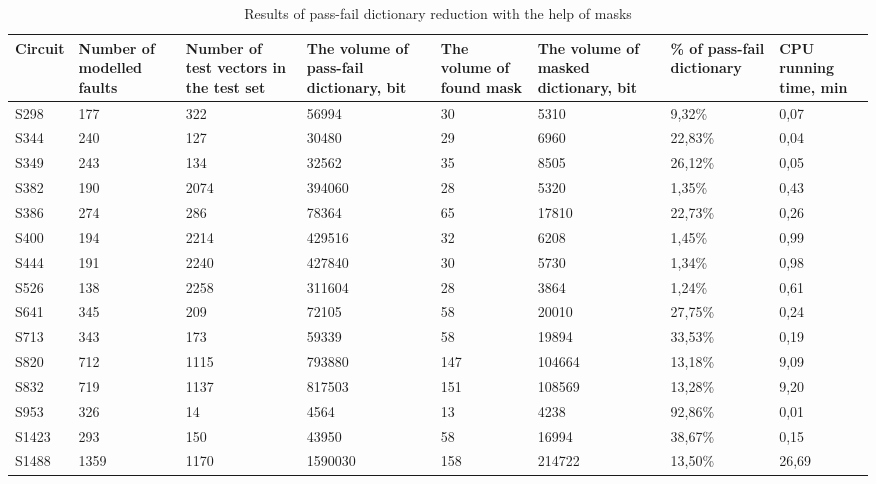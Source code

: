 \documentclass[nir, och, master]{SCWorks}
\begin{document}
\begin{table}[!ht]
	\footnotesize
	\caption{Results of pass-fail dictionary reduction with the help
	of masks} \label{table-2}
	\begin{tabular}{|p{1.5cm}|
	                 p{1.5cm}|
	                 p{1.5cm}|
	                 p{1.5cm}|
	                 p{1cm}|
	                 p{1.5cm}|
	                 p{1.5cm}|
	                 p{1cm}|}
		\hline \centering Circuit & Number of modelled faults & Number of test
		vectors in the test set & The volume of pass-fail dictionary,
		\linebreak bit & The volume of found mask & The volume of
		masked dictionary, \linebreak bit & \raggedright \% of pass-fail dictionary
		& CPU running time, \linebreak min
		\\
		\hline S298 & 177 & 322 & 56994 & 30 & 5310 & 9,32\% & 0,07\\
		\hline S344 & 240 & 127 & 30480 & 29 & 6960 & 22,83\% & 0,04\\
		\hline S349 & 243 & 134 & 32562 & 35 & 8505 & 26,12\% & 0,05\\
		\hline S382 & 190 & 2074 & 394060 & 28 & 5320 & 1,35\% & 0,43\\
		\hline S386 & 274 & 286 & 78364 & 65 & 17810 & 22,73\% & 0,26\\
		\hline S400 & 194 & 2214 & 429516 & 32 & 6208 & 1,45\% & 0,99\\
		\hline S444 & 191 & 2240 & 427840 & 30 & 5730 & 1,34\% & 0,98\\
		\hline S526 & 138 & 2258 & 311604 & 28 & 3864 & 1,24\% & 0,61\\
		\hline S641 & 345 & 209 & 72105 & 58 & 20010 & 27,75\% & 0,24\\
		\hline S713 & 343 & 173 & 59339 & 58 & 19894 & 33,53\% & 0,19\\
		\hline S820 & 712 & 1115 & 793880 & 147 & 104664 & 13,18\% & 9,09\\
		\hline S832 & 719 & 1137 & 817503 & 151 & 108569 & 13,28\% & 9,20\\
		\hline S953 & 326 & 14 & 4564 & 13 & 4238 & 92,86\% & 0,01\\
		\hline S1423 & 293 & 150 & 43950 & 58 & 16994 & 38,67\% & 0,15\\
		\hline S1488 & 1359 & 1170 & 1590030 & 158 & 214722 & 13,50\% & 26,69\\
		\hline
	\end{tabular}
\end{table}
\end{document}
